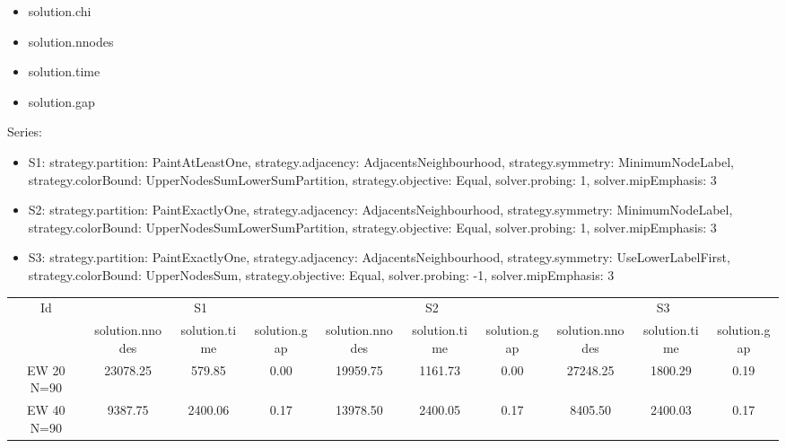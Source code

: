 \begin{itemize}
\item solution.chi
\item solution.nnodes
\item solution.time
\item solution.gap
\end{itemize}
Series:
\begin{itemize}
\item S1: strategy.partition: PaintAtLeastOne, strategy.adjacency: AdjacentsNeighbourhood, strategy.symmetry: MinimumNodeLabel, strategy.colorBound: UpperNodesSumLowerSumPartition, strategy.objective: Equal, solver.probing: 1, solver.mipEmphasis: 3
\item S2: strategy.partition: PaintExactlyOne, strategy.adjacency: AdjacentsNeighbourhood, strategy.symmetry: MinimumNodeLabel, strategy.colorBound: UpperNodesSumLowerSumPartition, strategy.objective: Equal, solver.probing: 1, solver.mipEmphasis: 3
\item S3: strategy.partition: PaintExactlyOne, strategy.adjacency: AdjacentsNeighbourhood, strategy.symmetry: UseLowerLabelFirst, strategy.colorBound: UpperNodesSum, strategy.objective: Equal, solver.probing: -1, solver.mipEmphasis: 3
\end{itemize}
\begin{tabular}{|c|ccc|ccc|ccc|}
\hline
\multicolumn{1}{|c|}{Id} & \multicolumn{3}{|c|}{S1} & \multicolumn{3}{|c|}{S2} & \multicolumn{3}{|c|}{S3}
\\
 & solution.nnodes & solution.time & solution.gap & solution.nnodes & solution.time & solution.gap & solution.nnodes & solution.time & solution.gap
\\
\hline
EW 20 N=90 & 23078.25 & 579.85 & 0.00 & 19959.75 & 1161.73 & 0.00 & 27248.25 & 1800.29 & 0.19
\\
EW 40 N=90 & 9387.75 & 2400.06 & 0.17 & 13978.50 & 2400.05 & 0.17 & 8405.50 & 2400.03 & 0.17
\\
\hline 
 \end{tabular}


